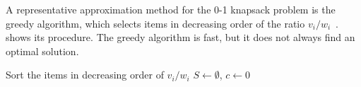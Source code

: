A representative approximation method for the 0-1 knapsack problem is the greedy algorithm,
which selects items in decreasing order of the ratio $v_i / w_i$~\cite{dantzig1957discrete}.
 shows its procedure.
The greedy algorithm is fast, but it does not always find an optimal solution.

\begin{algorithm}[tbp]
  \caption{Greedy algorithm for the 0-1 knapsack problem}
  \label{alg:greedy}
  Sort the items in decreasing order of $v_i / w_i$\;
  $S \gets \emptyset$, $c \gets 0$ 
  \;
\end{algorithm}
